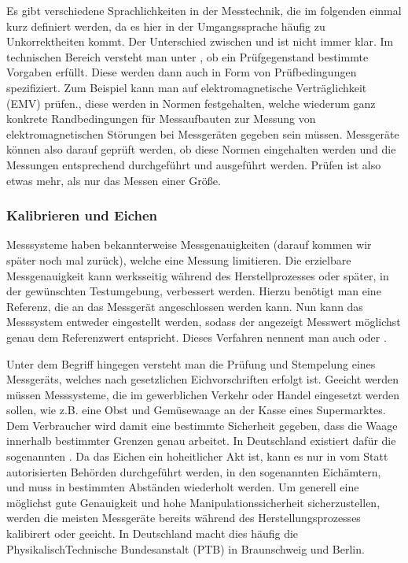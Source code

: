 \documentclass[letterpaper,10pt,english]{jupyterBook}
\begin{document}
\sphinxAtStartPar
Es gibt verschiedene Sprachlichkeiten in der Messtechnik, die im folgenden einmal kurz definiert werden, da es hier in der Umgangssprache häufig zu Unkorrektheiten kommt. Der Unterschied zwischen  und  ist nicht immer klar. Im technischen Bereich versteht man unter , ob ein Prüfgegenstand bestimmte Vorgaben erfüllt. Diese werden dann auch in Form von Prüfbedingungen spezifiziert. Zum Beispiel kann man auf elektromagnetische Verträglichkeit (EMV) prüfen., diese werden in Normen festgehalten, welche wiederum ganz konkrete Randbedingungen für Messaufbauten \sphinxhyphen{} zur Messung von elektromagnetischen Störungen \sphinxhyphen{} bei Messgeräten gegeben sein müssen. Messgeräte können also darauf geprüft werden, ob diese Normen eingehalten werden und die Messungen entsprechend durchgeführt und ausgeführt werden. Prüfen ist also etwas mehr, als nur das Messen einer Größe.


\subsubsection{Kalibrieren und Eichen}
\label{\detokenize{content/1_Messen_Einheit:kalibrieren-und-eichen}}
\sphinxAtStartPar


\sphinxAtStartPar
Messsysteme haben bekannterweise Messgenauigkeiten (darauf kommen wir später noch mal zurück), welche eine Messung limitieren. Die erzielbare Messgenauigkeit kann werksseitig während des Herstellprozesses oder später, in der gewünschten Testumgebung, verbessert werden. Hierzu benötigt man eine  Referenz, die an das Messgerät angeschlossen werden kann. Nun kann das Messsystem entweder eingestellt werden, sodass der angezeigt Messwert möglichst genau dem  Referenzwert entspricht. Dieses Verfahren nennent man auch  oder .

\sphinxAtStartPar
{}

\sphinxAtStartPar
Unter dem Begriff  hingegen versteht man die Prüfung und Stempelung eines Messgeräts, welches nach gesetzlichen Eichvorschriften erfolgt ist. Geeicht werden müssen Messsysteme, die im gewerblichen Verkehr oder Handel eingesetzt werden sollen, wie z.B. eine Obst\sphinxhyphen{} und Gemüsewaage an der Kasse eines Supermarktes. Dem Verbraucher wird damit eine bestimmte Sicherheit gegeben, dass die Waage \sphinxhyphen{} innerhalb bestimmter Grenzen \sphinxhyphen{} genau arbeitet. In Deutschland existiert dafür die sogenannten .
Da das Eichen ein hoheitlicher Akt ist, kann es nur in vom Statt autorisierten Behörden durchgeführt werden, in den sogenannten Eichämtern, und muss in bestimmten Abständen wiederholt werden. Um generell eine möglichst gute Genauigkeit und hohe Manipulationssicherheit sicherzustellen, werden die meisten Messgeräte bereits während des Herstellungsprozesses kalibirert oder geeicht. In Deutschland macht dies häufig die Physikalisch\sphinxhyphen{}Technische Bundesanstalt (PTB) in Braunschweig und Berlin.
\end{document}

